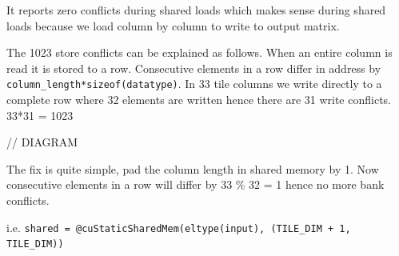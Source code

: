 \documentclass[12pt,a4paper]{article}
\begin{document}
It reports zero conflicts during shared loads which makes sense during shared loads because we load column by column to write to output matrix.

The 1023 store conflicts can be explained as follows. When an entire column is read it is stored to a row. Consecutive elements in a row differ in address by \texttt{column\_length*sizeof(datatype)}. In 33 tile columns we write directly to a complete row where 32 elements are written hence there are 31 write conflicts. 33*31 = 1023

// DIAGRAM

The fix is quite simple, pad the column length in shared memory by 1. Now consecutive elements in a row will differ by 33 \% 32 = 1 hence no more bank conflicts.

i.e. \texttt{shared = @cuStaticSharedMem(eltype(input), (TILE\_DIM + 1, TILE\_DIM))}
\end{document}
